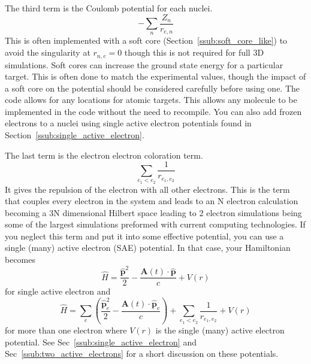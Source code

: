 \documentclass{article}
\begin{document}
The third term is the Coulomb potential for each nuclei.
\begin{equation}
  - \sum_{n} \frac{Z_n}{r_{e,n}}
\end{equation}
This is often implemented with a soft core (Section~\ref{ssub:soft_core_like}) to avoid the singularity at $r_{n,e}=0$ though this is not required for full 3D simulations. Soft cores can increase the ground state energy for a particular target. This is often done to match the experimental values, though the impact of a soft core on the potential should be considered carefully before using one. The code allows for any locations for atomic targets. This allows any molecule to be implemented in the code without the need to recompile. You can also add frozen electrons to a nuclei using single active electron potentials found in Section~\ref{ssub:single_active_electron}.

The last term is the electron electron coloration term.
\begin{equation}
  \sum_{e_1 < e_2}\frac{1}{r_{e_1, e_2}}
\end{equation}
It gives the repulsion of the electron with all other electrons. This is the term that couples every electron in the system and leads to an N electron calculation becoming a 3N dimensional Hilbert space leading to 2 electron simulations being some of the largest simulations preformed with current computing technologies. If you neglect this term and put it into some effective potential, you can use a single (many) active electron (SAE) potential. In that case, your Hamiltonian becomes
\begin{equation}
    \label{eq:H_SAE}
    \hat{H} = \frac{\hat{\mathbf{p}}^2}{2} - \frac{\mathbf{A}(t) \cdot \hat{\mathbf{p}}}{c} + V(r)
\end{equation}
for single active electron and
\begin{equation}
    \label{eq:H_TAE}
    \hat{H} = \sum_{e}\left(\frac{\hat{\mathbf{p}}^2_e}{2} - \frac{\mathbf{A}(t) \cdot \hat{\mathbf{p}}_e}{c}\right) + \sum_{e_1 < e_2}\frac{1}{r_{e_1, e_2}} + V(r)
\end{equation}
for more than one electron where $V(r)$ is the single (many) active electron potential. See Sec~\ref{ssub:single_active_electron} and  Sec~\ref{ssub:two_active_electrons} for a short discussion on these potentials.
\end{document}
